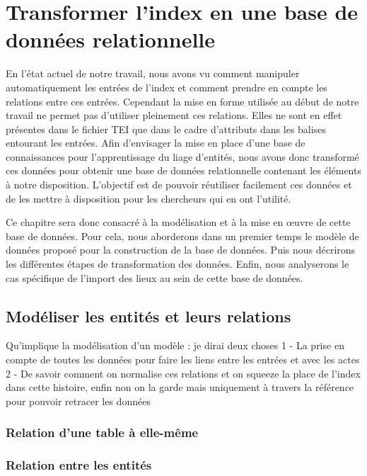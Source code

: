 \documentclass[a4paper,12pt,twoside]{book}
\begin{document}
	\chapter{Transformer l’index en une base de données relationnelle}
	
	En l'état actuel de notre travail, nous avons vu comment manipuler automatiquement les entrées de l'index et comment prendre en compte les relations entre ces entrées. Cependant la mise en forme utilisée au début de notre travail ne permet pas d'utiliser pleinement ces relations. Elles ne sont en effet présentes dans le fichier TEI que dans le cadre d'attributs dans les balises entourant les entrées. Afin d'envisager la mise en place d'une base de connaissances pour l'apprentissage du liage d'entités, nous avons donc transformé ces données pour obtenir une base de données relationnelle contenant les éléments à notre disposition. L'objectif est de pouvoir réutiliser facilement ces données et de les mettre à disposition pour les chercheurs qui en ont l'utilité.
	
	Ce chapitre sera donc consacré à la modélisation et à la mise en œuvre de cette base de données. Pour cela, nous aborderons dans un premier temps le modèle de données proposé pour la construction de la base de données. Puis nous décrirons les différentes étapes de transformation des données. Enfin, nous analyserons le cas spécifique de l'import des lieux au sein de cette base de données.
	
	\section{Modéliser les entités et leurs relations}
	
	
	
	Qu'implique la modélisation d'un modèle : je dirai deux choses 1 - La prise en compte de toutes les données pour faire les liens entre les entrées et avec les actes 2 - De savoir comment on normalise ces relations et on squeeze la place de l'index dans cette histoire, enfin non on la garde mais uniquement à travers la référence pour pouvoir retracer les données
	
	
	\subsection{Relation d’une table à elle-même}
	
	\subsection{Relation entre les entités}
	
\end{document}
